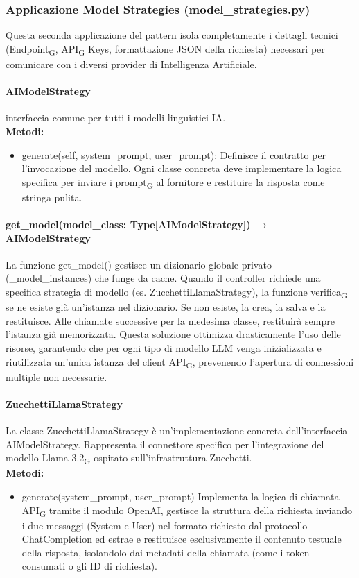 \documentclass[11pt,a4paper]{article}
\newcommand{\gls}[1]{#1\textsubscript{G}}
\begin{document}
\subsubsection{Applicazione Model Strategies
(model\_strategies.py)}
Questa seconda applicazione del pattern isola completamente i dettagli tecnici (\gls{Endpoint}, \gls{API} Keys, formattazione JSON della richiesta) necessari per comunicare con i diversi provider di Intelligenza Artificiale.
\paragraph{AIModelStrategy} interfaccia comune per tutti i modelli linguistici IA.
\\ \textbf{Metodi:}
\begin{itemize}
    \item generate(self, system\_prompt, user\_prompt): Definisce il contratto per l'invocazione del modello. Ogni classe concreta deve implementare la logica specifica per inviare i \gls{prompt} al fornitore e restituire la risposta come stringa pulita.
\end{itemize}
\paragraph{get\_model(model\_class: Type[AIModelStrategy]) $\rightarrow$ AIModelStrategy} La funzione get\_model() gestisce un dizionario globale privato (\_model\_instances) che funge da cache.
Quando il controller richiede una specifica strategia di modello (es. ZucchettiLlamaStrategy), la funzione \gls{verifica} se ne esiste già un'istanza nel dizionario. Se non esiste, la crea, la salva e la restituisce. Alle chiamate successive per la medesima classe, restituirà sempre l'istanza già memorizzata.
Questa soluzione ottimizza drasticamente l'uso delle risorse, garantendo che per ogni tipo di modello LLM venga inizializzata e riutilizzata un'unica istanza del client \gls{API}, prevenendo l'apertura di connessioni multiple non necessarie.

\paragraph{ZucchettiLlamaStrategy} La classe ZucchettiLlamaStrategy è un'implementazione concreta dell'interfaccia AIModelStrategy. Rappresenta il connettore specifico per l'integrazione del modello \gls{Llama 3.2} ospitato sull'infrastruttura Zucchetti.
\\ \textbf{Metodi:}
\begin{itemize}
    \item generate(system\_prompt, user\_prompt) Implementa la logica di chiamata \gls{API} tramite il modulo OpenAI, gestisce la struttura della richiesta inviando i due messaggi (System e User) nel formato richiesto dal protocollo ChatCompletion ed estrae e restituisce esclusivamente il contenuto testuale della risposta, isolandolo dai metadati della chiamata (come i token consumati o gli ID di richiesta).
\end{itemize}
\end{document}
